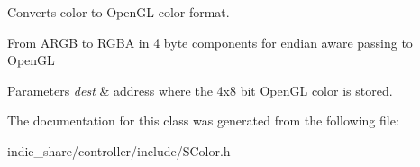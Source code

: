 Converts color to Open\+GL color format. 

From A\+R\+GB to R\+G\+BA in 4 byte components for endian aware passing to Open\+GL 
\begin{DoxyParams}{Parameters}
{\em dest} & address where the 4x8 bit Open\+GL color is stored. \\
\hline
\end{DoxyParams}


The documentation for this class was generated from the following file\+:\begin{DoxyCompactItemize}
\item 
indie\+\_\+share/controller/include/S\+Color.\+h\end{DoxyCompactItemize}
